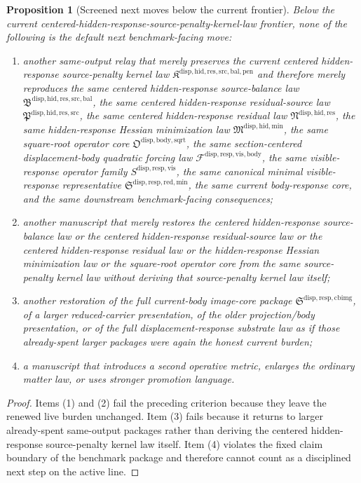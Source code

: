 \documentclass[11pt]{article}
\newcommand{\SourcePenaltyKernelLawPackage}{\mathfrak K^{\mathrm{disp,hid,res,src,bal,pen}}}
\newcommand{\SourceBalanceLawPackage}{\mathfrak B^{\mathrm{disp,hid,res,src,bal}}}
\newcommand{\ResidualSourceLawPackage}{\mathfrak P^{\mathrm{disp,hid,res,src}}}
\newcommand{\ResidualLawPackage}{\mathfrak N^{\mathrm{disp,hid,res}}}
\newcommand{\HiddenMinimizationPackage}{\mathfrak M^{\mathrm{disp,hid,min}}}
\newcommand{\SquareRootOperatorCore}{\mathfrak O^{\mathrm{disp,body,sqrt}}}
\newcommand{\VisibleBodyForcingLaw}{\mathscr F^{\mathrm{disp,resp,vis,body}}}
\newcommand{\VisibleResponseOperator}{S^{\mathrm{disp,resp,vis}}}
\newcommand{\MinimalReducedStructure}{\mathfrak S^{\mathrm{disp,resp,red,min}}}
\newcommand{\CurrentBodyImageCore}{\mathfrak S^{\mathrm{disp,resp,cbimg}}}
\newtheorem{proposition}{Proposition}
\begin{document}
\begin{proposition}[Screened next moves below the current frontier]
Below the current centered-hidden-response-source-penalty-kernel-law frontier, none of the following is the default next benchmark-facing move:
\begin{enumerate}
    \item another same-output relay that merely preserves the current centered hidden-response source-penalty kernel law \(\SourcePenaltyKernelLawPackage\) and therefore merely reproduces the same centered hidden-response source-balance law \(\SourceBalanceLawPackage\), the same centered hidden-response residual-source law \(\ResidualSourceLawPackage\), the same centered hidden-response residual law \(\ResidualLawPackage\), the same hidden-response Hessian minimization law \(\HiddenMinimizationPackage\), the same square-root operator core \(\SquareRootOperatorCore\), the same section-centered displacement-body quadratic forcing law \(\VisibleBodyForcingLaw\), the same visible-response operator family \(\VisibleResponseOperator\), the same canonical minimal visible-response representative \(\MinimalReducedStructure\), the same current body-response core, and the same downstream benchmark-facing consequences;
    \item another manuscript that merely restores the centered hidden-response source-balance law or the centered hidden-response residual-source law or the centered hidden-response residual law or the hidden-response Hessian minimization law or the square-root operator core from the same source-penalty kernel law without deriving that source-penalty kernel law itself;
    \item another restoration of the full current-body image-core package \(\CurrentBodyImageCore\), of a larger reduced-carrier presentation, of the older projection/body presentation, or of the full displacement-response substrate law as if those already-spent larger packages were again the honest current burden;
    \item a manuscript that introduces a second operative metric, enlarges the ordinary matter law, or uses stronger promotion language.
\end{enumerate}
\end{proposition}

\begin{proof}
Items (1) and (2) fail the preceding criterion because they leave the renewed live burden unchanged. Item (3) fails because it returns to larger already-spent same-output packages rather than deriving the centered hidden-response source-penalty kernel law itself. Item (4) violates the fixed claim boundary of the benchmark package and therefore cannot count as a disciplined next step on the active line.
\end{proof}
\end{document}
